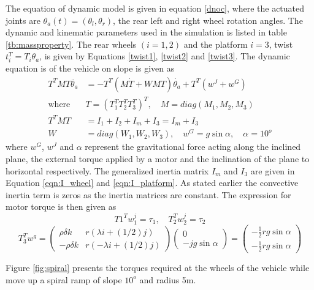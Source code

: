 {The equation of  dynamic model  is given in equation \ref{dnoc}, where the actuated joints are  $\theta_a(t)=(\theta_l, \theta_r) $, the rear left and right wheel rotation angles. The dynamic  and kinematic  parameters used in the simulation is listed in table \ref{tb:massproperty}. The rear wheels $(i=1,2)$ and the platform $i=3$, twist $t_i^T=T_i\theta_a$, is given by Equations \ref{twist1}, \ref{twist2} and \ref{twist3}. The dynamic equation is of the vehicle on slope is given as 
\begin{equation}
\label{dnoc}
\begin{aligned}
T^TMT\ddot{\theta_a}&=-T^T(M\dot{T}+WMT)\dot{\theta_a}+T^T(w^J+w^G)\\
\text{where} \quad &
T=(T_1^T T_2^T T_3^T)^T, \quad M=diag(M_1, M_2, M_3)\\
T^TMT &=I_1+I_2+I_m+I_3= I_m+I_3\\
W&=diag(W_1,W_2,W_3),\quad w^G=g\sin\alpha, \quad \alpha=10^o
\end{aligned}
\end{equation}
where $w^G$, $ w^J$ and $\alpha$ represent the gravitational force acting along the inclined plane,  the external torque applied by a motor and the inclination of the plane to horizontal respectively. The generalized inertia matrix $I_m$ and $I_3$ are given in Equation \ref{eqn:I_wheel} and \ref{eqn:I_platform}.
As stated earlier the convective inertia term is zeros as the inertia matrices are constant. The expression for motor torque  is then given as 
\begin{equation}
T1^Tw_1^j=\tau_1, \quad T_2^Tw_2^j=\tau_2
\end{equation}
\begin{equation}
 T_3^Tw^g=\begin{pmatrix}
\rho\delta k & r(\lambda i+(1/2)j) \\
 -\rho\delta k & r(-\lambda i+(1/2)j)
\end{pmatrix}
\begin{pmatrix}
0\\
-jg\sin\alpha
\end{pmatrix}=\begin{pmatrix}
-\frac{1}{2}rg\sin\alpha\\ -\frac{1}{2}rg\sin\alpha
\end{pmatrix}
\end{equation} 

Figure \ref{fig:spiral} presents the torques required at the wheels of the vehicle while move up a spiral ramp  of slope $10^o$ and radius 5m. 

}
